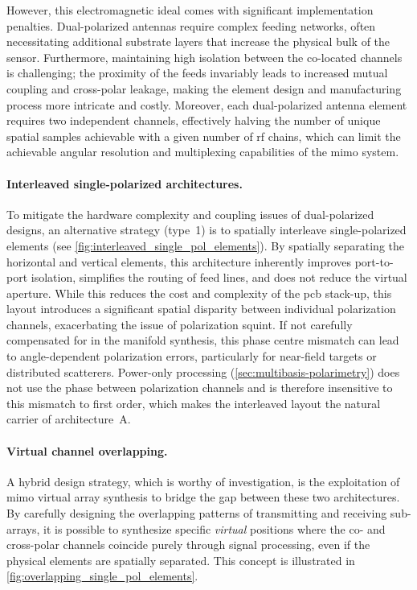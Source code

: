 However, this electromagnetic ideal comes with significant implementation penalties.
Dual-polarized antennas require complex feeding networks, often necessitating additional substrate layers that increase the physical bulk of the sensor.
Furthermore, maintaining high isolation between the co-located channels is challenging; the proximity of the feeds invariably leads to increased mutual coupling and cross-polar leakage, making the element design and manufacturing process more intricate and costly.
Moreover, each dual-polarized antenna element requires two independent channels, effectively halving the number of unique spatial samples achievable with a given number of \gls{rf} chains, which can limit the achievable angular resolution and multiplexing capabilities of the \gls{mimo} system.

\paragraph{Interleaved single-polarized architectures.}
To mitigate the hardware complexity and coupling issues of dual-polarized designs, an alternative strategy (type~1) is to spatially interleave single-polarized elements (see \cref{fig:interleaved_single_pol_elements}).
By spatially separating the horizontal and vertical elements, this architecture inherently improves port-to-port isolation, simplifies the routing of feed lines, and does not reduce the virtual aperture.
While this reduces the cost and complexity of the \gls{pcb} stack-up, this layout introduces a significant spatial disparity between individual polarization channels, exacerbating the issue of polarization squint.
If not carefully compensated for in the manifold synthesis, this phase centre mismatch can lead to angle-dependent polarization errors, particularly for near-field targets or distributed scatterers.
Power-only processing (\cref{sec:multibasis-polarimetry}) does not use the phase between polarization channels and is therefore insensitive to this mismatch to first order, which makes the interleaved layout the natural carrier of architecture~A.

\paragraph{Virtual channel overlapping.}
A hybrid design strategy, which is worthy of investigation, is the exploitation of \gls{mimo} virtual array synthesis to bridge the gap between these two architectures.
By carefully designing the overlapping patterns of transmitting and receiving sub-arrays, it is possible to synthesize specific \emph{virtual} positions where the co- and cross-polar channels coincide purely through signal processing, even if the physical elements are spatially separated.
This concept is illustrated in \cref{fig:overlapping_single_pol_elements}.

